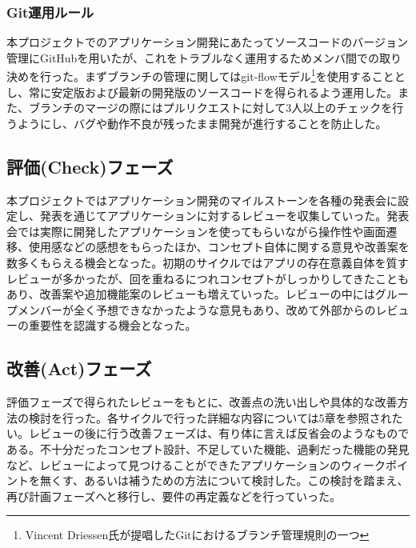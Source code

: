\subsubsection{Git運用ルール}
本プロジェクトでのアプリケーション開発にあたってソースコードのバージョン管理にGitHubを用いたが、これをトラブルなく運用するためメンバ間での取り決めを行った。まずブランチの管理に関してはgit-flowモデル\footnote{Vincent Driessen氏が提唱したGitにおけるブランチ管理規則の一つ}を使用することとし、常に安定版および最新の開発版のソースコードを得られるよう運用した。また、ブランチのマージの際にはプルリクエストに対して3人以上のチェックを行うようにし、バグや動作不良が残ったまま開発が進行することを防止した。
\subsection{評価(Check)フェーズ}
本プロジェクトではアプリケーション開発のマイルストーンを各種の発表会に設定し、発表を通じてアプリケーションに対するレビューを収集していった。発表会では実際に開発したアプリケーションを使ってもらいながら操作性や画面遷移、使用感などの感想をもらったほか、コンセプト自体に関する意見や改善案を数多くもらえる機会となった。初期のサイクルではアプリの存在意義自体を質すレビューが多かったが、回を重ねるにつれコンセプトがしっかりしてきたこともあり、改善案や追加機能案のレビューも増えていった。レビューの中にはグループメンバーが全く予想できなかったような意見もあり、改めて外部からのレビューの重要性を認識する機会となった。
\subsection{改善(Act)フェーズ}
評価フェーズで得られたレビューをもとに、改善点の洗い出しや具体的な改善方法の検討を行った。各サイクルで行った詳細な内容については5章を参照されたい。レビューの後に行う改善フェーズは、有り体に言えば反省会のようなものである。不十分だったコンセプト設計、不足していた機能、過剰だった機能の発見など、レビューによって見つけることができたアプリケーションのウィークポイントを無くす、あるいは補うための方法について検討した。この検討を踏まえ、再び計画フェーズへと移行し、要件の再定義などを行っていった。
